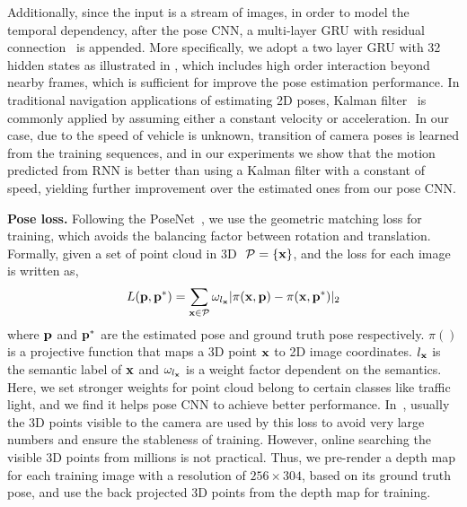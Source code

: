 Additionally, since the input is a stream of images, in order to model the temporal dependency,
after the pose CNN, a multi-layer GRU with residual connection~\cite{wu2016google} is appended.
More specifically, we adopt a two layer GRU with 32 hidden states as illustrated in , which includes high order interaction beyond nearby frames, which is sufficient for improve the pose estimation performance.
In traditional navigation applications of estimating 2D poses,  Kalman filter~\cite{kalman1960new} is commonly applied by assuming either a constant velocity or acceleration.
In our case, due to the speed of vehicle is unknown, transition of camera poses is learned from the training sequences, and in our experiments we show that the motion predicted from RNN is better than using a Kalman filter with a constant of speed, yielding further improvement over the estimated ones from our pose CNN.

\textbf{Pose loss.}
Following the PoseNet~\cite{kendall2017geometric}, we use the geometric matching loss for training, which avoids the balancing factor between rotation and translation.
Formally, given a set of point cloud in 3D $~{\mathcal P}=\{{\mathbf x}\}$, and the loss for each image is written as,
{\vspace{-0.5\baselineskip}
\begin{align}
L({\mathbf p}, {\mathbf p}^*) = \sum_{{\mathbf x} \in {\mathcal P}}\omega_{l_{\mathbf x}}|\pi({\mathbf x}, {\mathbf p}) - \pi({\mathbf x}, {\mathbf p}^*)|_2
\label{eq:proj_loss}
\end{align}
}
where ${\mathbf p}$ and ${\mathbf p}^*$ are the estimated pose and ground truth pose respectively. $\pi()$ is a projective function that maps a 3D point ${\mathbf x}$ to 2D image coordinates. $l_{\mathbf x}$ is the semantic label of ${\mathbf x}$ and $\omega_{l_{\mathbf x}}$ is a weight factor dependent on the semantics. Here, we set stronger weights for point cloud belong to certain classes like traffic light, and we find it helps pose CNN to achieve better performance.
In~\cite{kendall2017geometric}, usually the 3D points visible to the camera are used by this loss to avoid very large numbers and ensure the stableness of training. However, online searching the visible 3D points from millions is not practical.
Thus, we pre-render a depth map for each training image with a resolution of $256 \times 304$, based on its ground truth pose, and use the back projected 3D points from the depth map for training.

